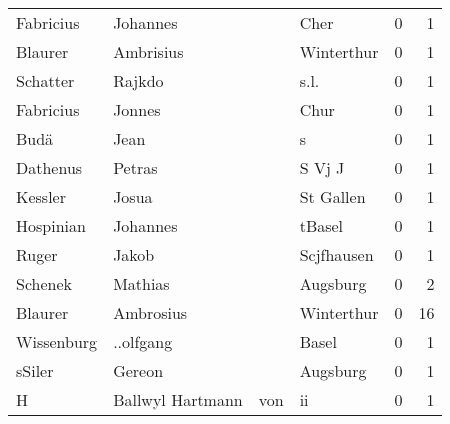 \begin{tabular}{llllrr}
                Fabricius &                           Johannes &             &                                        Cher &          0 &         1 \\
                  Blaurer &                          Ambrisius &             &                                  Winterthur &          0 &         1 \\
                 Schatter &                             Rajkdo &             &                                        s.l. &          0 &         1 \\
                Fabricius &                             Jonnes &             &                                        Chur &          0 &         1 \\
                     Budä &                               Jean &             &                                           s &          0 &         1 \\
                 Dathenus &                             Petras &             &                                      S Vj J &          0 &         1 \\
                  Kessler &                              Josua &             &                                   St Gallen &          0 &         1 \\
                Hospinian &                           Johannes &             &                                      tBasel &          0 &         1 \\
                    Ruger &                              Jakob &             &                                  Scjfhausen &          0 &         1 \\
                  Schenek &                            Mathias &             &                                    Augsburg &          0 &         2 \\
                  Blaurer &                          Ambrosius &             &                                  Winterthur &          0 &        16 \\
               Wissenburg &                          ..olfgang &             &                                       Basel &          0 &         1 \\
                   sSiler &                             Gereon &             &                                    Augsburg &          0 &         1 \\
                        H &                   Ballwyl Hartmann &         von &                                          ii &          0 &         1 \\

\end{tabular}
